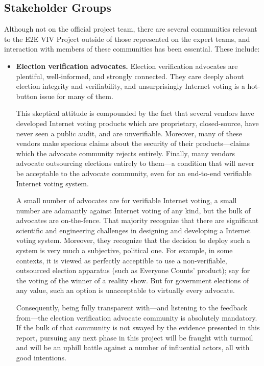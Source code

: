 \subsection{Stakeholder Groups}
\label{sec:stakeholder-groups}

Although not on the official project team, there are several
communities relevant to the E2E VIV Project outside of those
represented on the expert teams, and interaction with members of these
communities has been essential. These include:
\begin{itemize}
\item \textbf{Election verification advocates.} Election verification
  advocates are plentiful, well-informed, and strongly connected.
  They care deeply about election integrity and verifiability, and
  unsurprisingly Internet voting is a hot-button issue for many of
  them.

  This skeptical attitude is compounded by the fact that several
  vendors have developed Internet voting products which are
  proprietary, closed-source, have never seen a public audit, and are
  unverifiable. Moreover, many of these vendors make specious claims
  about the security of their products---claims which the advocate
  community rejects entirely. Finally, many vendors advocate
  outsourcing elections entirely to them---a condition that will never
  be acceptable to the advocate community, even for an end-to-end
  verifiable Internet voting system.

  A small number of advocates are for verifiable Internet voting, a
  small number are adamantly against Internet voting of any kind, but
  the bulk of advocates are on-the-fence. That majority recognize
  that there are significant scientific and engineering challenges in
  designing and developing a Internet voting system. Moreover, they
  recognize that the decision to deploy such a system is very much a
  subjective, political one. For example, in some contexts, it is
  viewed as perfectly acceptible to use a non-verifiable, outsourced
  election apparatus (such as Everyone Counts' product); say for the
  voting of the winner of a reality show. But for government
  elections of any value, such an option is unacceptable to virtually
  every advocate.

  Consequently, being fully transparent with---and listening to the
  feedback from---the election verification advocate community is
  absolutely mandatory. If the bulk of that community is not swayed
  by the evidence presented in this report, pursuing any next phase in
  this project will be fraught with turmoil and will be an uphill
  battle against a number of influential actors, all with good
  intentions.


\end{itemize}
